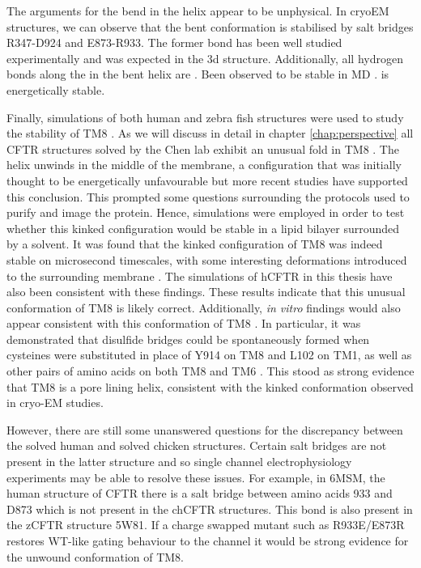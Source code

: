 The arguments for the bend in the helix appear to be unphysical. In cryoEM structures, we can observe that the bent conformation is stabilised by salt bridges R347-D924 and E873-R933. The former bond has been well studied experimentally and was expected in the 3d structure. Additionally, all hydrogen bonds along the in the bent helix are . Been observed to be stable in MD \cite{corradi2018} .  is energetically stable.

Finally, simulations of both human and zebra fish structures were used to study the stability of TM8 \cite{corradi2018}. As we will discuss in detail in chapter \ref{chap:perspective} all CFTR structures solved by the Chen lab exhibit an unusual fold in TM8 \cite{fiedorczuk2021, liu2017, liu2019, zhang2016, zhang2018a, zhang2017a}. The helix unwinds in the middle of the membrane, a configuration that was initially thought to be energetically unfavourable but more recent studies have supported this conclusion. This prompted some questions surrounding the protocols used to purify and image the protein. Hence, simulations were employed in order to test whether this kinked configuration would be stable in a lipid bilayer surrounded by a solvent. It was found that the kinked configuration of TM8 was indeed stable on microsecond timescales, with some interesting deformations introduced to the surrounding membrane \cite{corradi2018}. The simulations of hCFTR in this thesis have also been consistent with these findings. These results indicate that this unusual conformation of TM8 is likely correct. Additionally, \textit{in vitro} findings would also appear consistent with this conformation of TM8 \cite{infield2021}. In particular, it was demonstrated that disulfide bridges could be  spontaneously formed when cysteines were substituted in place of Y914 on TM8 and L102 on TM1, as well as other pairs of amino acids on both TM8 and TM6 \cite{negoda2019}. This stood as strong evidence that TM8 is a pore lining helix, consistent with the kinked conformation observed in cryo-EM studies.

However, there are still some unanswered questions for the discrepancy between the solved human and solved chicken structures. Certain salt bridges are not present in the latter structure and so single channel electrophysiology experiments may be able to resolve these issues. For example, in 6MSM, the human structure of CFTR there is a salt bridge between amino acids 933 and D873 which is not present in the chCFTR structures. This bond is also present in the zCFTR structure 5W81. If a charge swapped mutant such as R933E/E873R restores WT-like gating behaviour to the channel it would be  strong evidence for the unwound conformation of TM8. 

